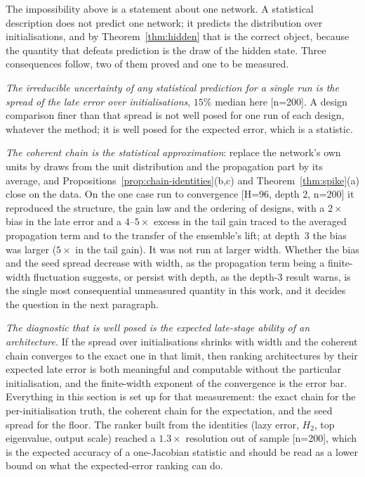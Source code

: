 The impossibility above is a statement about one network. A statistical
description does not predict one network; it predicts the distribution over
initialisations, and by Theorem~\ref{thm:hidden} that is the correct object,
because the quantity that defeats prediction is the draw of the hidden state.
Three consequences follow, two of them proved and one to be measured.

\emph{The irreducible uncertainty of any statistical prediction for a single
run is the spread of the late error over initialisations}, $15\%$ median here
[n=200]. A design comparison finer than that spread is not well posed for one
run of each design, whatever the method; it is well posed for the expected
error, which is a statistic.

\emph{The coherent chain is the statistical approximation}: replace the
network's own units by draws from the unit distribution and the propagation
part by its average, and Propositions~\ref{prop:chain-identities}(b,c) and
Theorem~\ref{thm:spike}(a) close on the data. On the one case run to
convergence [H=96, depth 2, n=200] it reproduced the structure, the gain law
and the ordering of designs, with a $2\times$ bias in the late error and a
$4$--$5\times$ excess in the tail gain traced to the averaged propagation term and
to the transfer of the ensemble's lift; at depth~3 the bias was larger
($5\times$ in the tail gain). It was not run at larger width. Whether the
bias and the seed spread decrease with width, as the propagation term being
a finite-width fluctuation suggests, or persist with depth, as the depth-3
result warns, is the single most consequential unmeasured quantity in this
work, and it decides the question in the next paragraph.

\emph{The diagnostic that is well posed is the expected late-stage ability of an
architecture.} If the spread over initialisations shrinks with width and the
coherent chain converges to the exact one in that limit, then ranking
architectures by their expected late error is both meaningful and computable
without the particular initialisation, and the finite-width exponent of the
convergence is the error bar. Everything in this section is set up for that
measurement: the exact chain for the per-initialisation truth, the coherent
chain for the expectation, and the seed spread for the floor. The ranker
built from the identities (lazy error, $H_2$, top eigenvalue, output scale)
reached a $1.3\times$ resolution out of sample [n=200], which is the expected
accuracy of a one-Jacobian statistic and should be read as a lower bound on
what the expected-error ranking can do.

